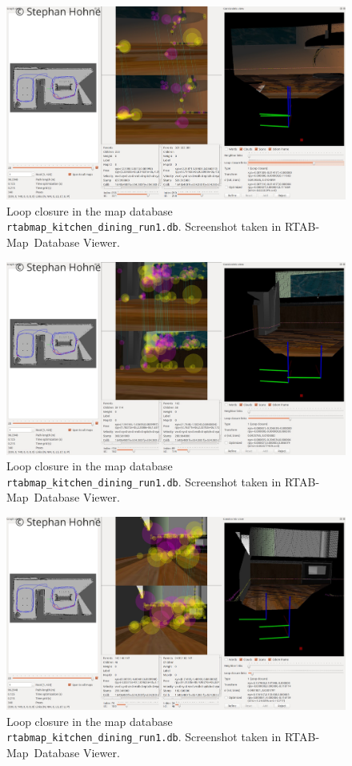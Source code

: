 \documentclass[10pt, journal, compsoc]{IEEEtran}
\newcommand{\rtab}{RTAB-Map}
\begin{document}
\begin{figure}[thpb]
      \centering
      \includegraphics[width=\textwidth]{images/loop_closure_2.jpg}
      \caption{Loop closure in the map database \texttt{rtabmap\_kitchen\_dining\_run1.db}. Screenshot taken in \rtab\ Database Viewer.}
      \label{fig:loop_closure_2}
\end{figure}
\begin{figure}[thpb]
      \centering
      \includegraphics[width=\textwidth]{images/loop_closure_3.jpg}
      \caption{Loop closure in the map database \texttt{rtabmap\_kitchen\_dining\_run1.db}. Screenshot taken in \rtab\ Database Viewer.}
      \label{fig:loop_closure_3}
\end{figure}
\begin{figure}[thpb]
      \centering
      \includegraphics[width=\textwidth]{images/loop_closure_4.jpg}
      \caption{Loop closure in the map database \texttt{rtabmap\_kitchen\_dining\_run1.db}. Screenshot taken in \rtab\ Database Viewer.}
      \label{fig:loop_closure_4}
\end{figure}
\end{document}
